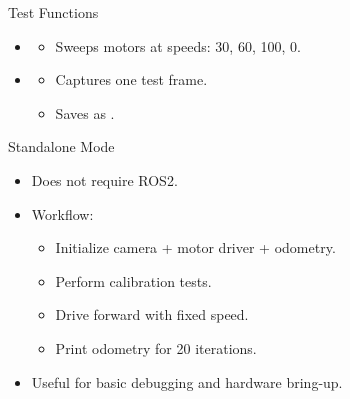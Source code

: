 \begin{frame}{Test Functions}
	\begin{itemize}
		\item \textbf{}
		\begin{itemize}
			\item Sweeps motors at speeds: 30, 60, 100, 0.
		\end{itemize}
		\item \textbf{}
		\begin{itemize}
			\item Captures one test frame.
			\item Saves as .
		\end{itemize}
	\end{itemize}
\end{frame}

\begin{frame}{Standalone Mode}
	\begin{itemize}
		\item Does not require ROS2.
		\item Workflow:
		\begin{itemize}
			\item Initialize camera + motor driver + odometry.
			\item Perform calibration tests.
			\item Drive forward with fixed speed.
			\item Print odometry for 20 iterations.
		\end{itemize}
		\item Useful for basic debugging and hardware bring-up.
	\end{itemize}
\end{frame}

